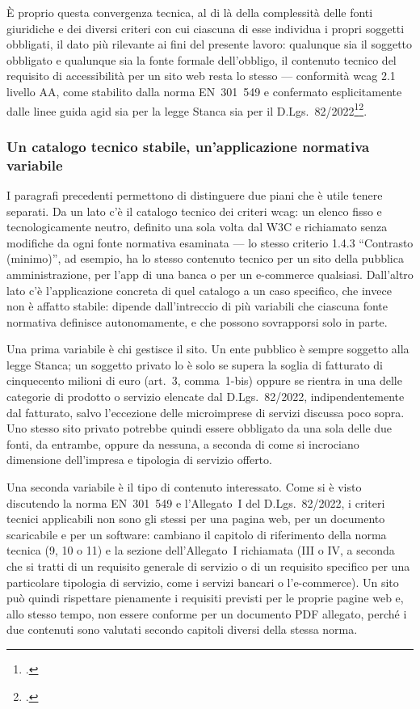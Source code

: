 È proprio questa convergenza tecnica, al di là della complessità delle fonti giuridiche e dei diversi criteri con cui ciascuna di esse individua i propri soggetti obbligati, il dato più rilevante ai fini del presente lavoro: qualunque sia il soggetto obbligato e qualunque sia la fonte formale dell'obbligo, il contenuto tecnico del requisito di accessibilità per un sito web resta lo stesso --- conformità \gls{wcag} 2.1 livello AA, come stabilito dalla norma EN~301~549 e confermato esplicitamente dalle linee guida \gls{agid} sia per la legge Stanca sia per il D.Lgs.~82/2022\footcite[§~2.2]{agid:lg-stanca}\footcite[§~8.5]{agid:lg-82-2022}.

\subsubsection{Un catalogo tecnico stabile, un'applicazione normativa variabile}

I paragrafi precedenti permettono di distinguere due piani che è utile tenere separati. Da un lato c'è il catalogo tecnico dei criteri \gls{wcag}: un elenco fisso e tecnologicamente neutro, definito una sola volta dal W3C e richiamato senza modifiche da ogni fonte normativa esaminata --- lo stesso criterio 1.4.3 \enquote{Contrasto (minimo)}, ad esempio, ha lo stesso contenuto tecnico per un sito della pubblica amministrazione, per l'app di una banca o per un e-commerce qualsiasi. Dall'altro lato c'è l'applicazione concreta di quel catalogo a un caso specifico, che invece non è affatto stabile: dipende dall'intreccio di più variabili che ciascuna fonte normativa definisce autonomamente, e che possono sovrapporsi solo in parte.

Una prima variabile è chi gestisce il sito. Un ente pubblico è sempre soggetto alla legge Stanca; un soggetto privato lo è solo se supera la soglia di fatturato di cinquecento milioni di euro (art.~3, comma~1-bis) oppure se rientra in una delle categorie di prodotto o servizio elencate dal D.Lgs.~82/2022, indipendentemente dal fatturato, salvo l'eccezione delle microimprese di servizi discussa poco sopra. Uno stesso sito privato potrebbe quindi essere obbligato da una sola delle due fonti, da entrambe, oppure da nessuna, a seconda di come si incrociano dimensione dell'impresa e tipologia di servizio offerto.

Una seconda variabile è il tipo di contenuto interessato. Come si è visto discutendo la norma EN~301~549 e l'Allegato~I del D.Lgs.~82/2022, i criteri tecnici applicabili non sono gli stessi per una pagina web, per un documento scaricabile e per un software: cambiano il capitolo di riferimento della norma tecnica (9, 10 o 11) e la sezione dell'Allegato~I richiamata (III o IV, a seconda che si tratti di un requisito generale di servizio o di un requisito specifico per una particolare tipologia di servizio, come i servizi bancari o l'e-commerce). Un sito può quindi rispettare pienamente i requisiti previsti per le proprie pagine web e, allo stesso tempo, non essere conforme per un documento PDF allegato, perché i due contenuti sono valutati secondo capitoli diversi della stessa norma.

